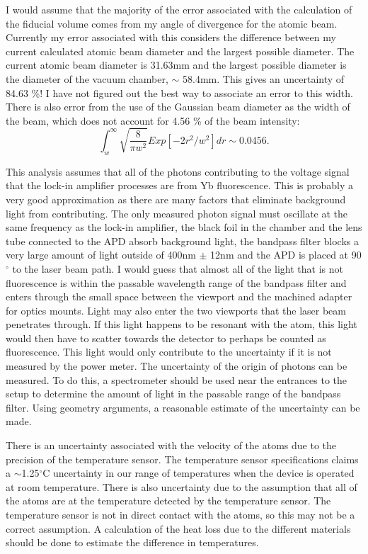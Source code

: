 \documentclass[12pt, a4paper]{article}
\begin{document}
I would assume that the majority of the error associated with the calculation of the fiducial volume comes from my angle of divergence for the atomic beam. Currently my error associated with this considers the difference between my current calculated atomic beam diameter and the largest possible diameter. The current atomic beam diameter is 31.63mm and the largest possible diameter is the diameter of the vacuum chamber, $\sim$ 58.4mm. This gives an uncertainty of 84.63 \%! I have not figured out the best way to associate an error to this width. There is also error from the use of the Gaussian beam diameter as the width of the beam, which does not account for 4.56 \% of the beam intensity:
\begin{equation}
\int_{w}^{\infty} \sqrt{\frac{8}{\pi w^2}} Exp[-2r^2/w^2]dr \sim 0.0456.
\end{equation}

This analysis assumes that all of the photons contributing to the voltage signal that the lock-in amplifier processes are from Yb fluorescence. This is probably a very good approximation as there are many factors that eliminate background light from contributing. The only measured photon signal must oscillate at the same frequency as the lock-in amplifier, the black foil in the chamber and the lens tube connected to the APD absorb background light, the bandpass filter blocks a very large amount of light outside of 400nm $\pm$ 12nm and the APD is placed at 90$^{\circ}$ to the laser beam path. I would guess that almost all of the light that is not fluorescence is within the passable wavelength range of the bandpass filter and enters through the small space between the viewport and the machined adapter for optics mounts. Light may also enter the two viewports that the laser beam penetrates through. If this light happens to be resonant with the atom, this light would then have to scatter towards the detector to perhaps be counted as fluorescence. This light would only contribute to the uncertainty if it is not measured by the power meter. The uncertainty of the origin of photons can be measured. To do this, a spectrometer should be used near the entrances to the setup to determine the amount of light in the passable range of the bandpass filter. Using geometry arguments, a reasonable estimate of the uncertainty can be made.

There is an uncertainty associated with the velocity of the atoms due to the precision of the temperature sensor. The temperature sensor specifications claims a $\sim$1.25$^{\circ}$C  uncertainty in our range of temperatures when the device is operated at room temperature. There is also uncertainty due to the assumption that all of the atoms are at the temperature detected by the temperature sensor. The temperature sensor is not in direct contact with the atoms, so this may not be a correct assumption. A calculation of the heat loss due to the different materials should be done to estimate the difference in temperatures.
\end{document}

